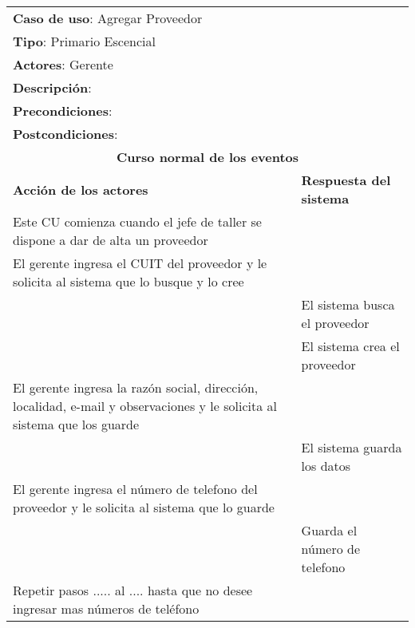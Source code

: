 


	\begin{longtable}{ |p{8cm}|p{8cm}| }
		\hline
		\multicolumn{2}{|p{16cm}|}{\textbf{Caso de uso}: Agregar Proveedor}\\
		\multicolumn{2}{|p{16cm}|}{\textbf{Tipo}: Primario Escencial}\\
		\multicolumn{2}{|p{16cm}|}{\textbf{Actores}: Gerente}\\
		\multicolumn{2}{|p{16cm}|}{\textbf{Descripción}: }\\
		\multicolumn{2}{|p{16cm}|}{\textbf{Precondiciones}: }\\
		\multicolumn{2}{|p{16cm}|}{\textbf{Postcondiciones}: }\\
		\hline
		\multicolumn{2}{|c|}{\textbf{Curso normal de los eventos}}\\
		\hline
		\textbf{Acción de los actores} & \textbf{Respuesta del sistema}\\
		\hline
			\inc Este CU comienza cuando el jefe de taller se dispone a dar de alta un proveedor& \\
			\hline
			\inc  El gerente ingresa el CUIT del proveedor y le solicita al sistema que lo busque y lo cree& \inc  \\
			\hline
			\inc  & El sistema busca el proveedor\inc  \\
			\hline
			\inc  & El sistema crea el proveedor\inc  \\
			\hline
			\inc El gerente ingresa la razón social, dirección, localidad, e-mail y observaciones y le solicita al sistema que los guarde  & \inc  \\
			\hline
			\inc  & El sistema guarda los datos\inc  \\
			\hline
			\inc El gerente ingresa el número de telefono del proveedor y le solicita al sistema que lo guarde& \inc  \\
			\hline
			\inc  & Guarda el número de telefono\inc  \\
			\hline
			\inc  Repetir pasos ..... al .... hasta que no desee ingresar mas números de teléfono& \inc  \\

\end{longtable}

